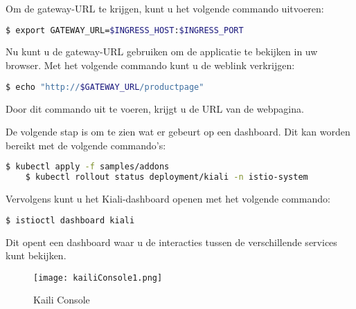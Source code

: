 Om de gateway-URL te krijgen, kunt u het volgende commando uitvoeren:

\begin{lstlisting}[language=bash]
	$ export GATEWAY_URL=$INGRESS_HOST:$INGRESS_PORT
\end{lstlisting}

Nu kunt u de gateway-URL gebruiken om de applicatie te bekijken in uw browser. Met het volgende commando kunt u de weblink verkrijgen:

\begin{lstlisting}[language=bash]
	$ echo "http://$GATEWAY_URL/productpage"
\end{lstlisting}

Door dit commando uit te voeren, krijgt u de URL van de webpagina.

De volgende stap is om te zien wat er gebeurt op een dashboard. Dit kan worden bereikt met de volgende commando's:

\begin{lstlisting}[language=bash]
	$ kubectl apply -f samples/addons
	$ kubectl rollout status deployment/kiali -n istio-system
\end{lstlisting}

Vervolgens kunt u het Kiali-dashboard openen met het volgende commando:

\begin{lstlisting}[language=bash]
	$ istioctl dashboard kiali
\end{lstlisting}

Dit opent een dashboard waar u de interacties tussen de verschillende services kunt bekijken.

\begin{figure}[H]
	\centering	
	\texttt{[image: kailiConsole1.png]} 
	\caption{Kaili Console} 
	\label{fig:kaili1} 
\end{figure}
\FloatBarrier
